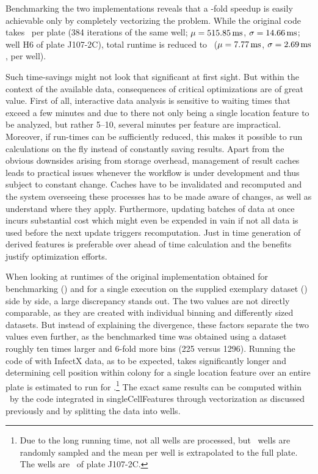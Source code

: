 
Benchmarking the two implementations reveals that a \knitrScfBenchmarkSpeedup -fold speedup is easily achievable only by completely vectorizing the problem. While the original code takes \knitrScfBenchmarkEdgeTotal\ per plate (384 iterations of the same well; $\mu=\SI{515.85}{\milli\second}$, $\sigma=\SI{14.66}{\milli\second}$; well H6 of plate J107-2C), total runtime is reduced to \knitrScfBenchmarkFacetTotal\ ($\mu=\SI{7.77}{\milli\second}$, $\sigma=\SI{2.69}{\milli\second}$, per well).

Such time-savings might not look that significant at first sight. But within the context of the available data, consequences of critical optimizations are of great value. First of all, interactive data analysis is sensitive to waiting times that exceed a few minutes and due to there not only being a single location feature to be analyzed, but rather 5--10, several minutes per feature are impractical. Moreover, if run-times can be sufficiently reduced, this makes it possible to run calculations on the fly instead of constantly saving results. Apart from the obvious downsides arising from storage overhead, management of result caches leads to practical issues whenever the workflow is under development and thus subject to constant change. Caches have to be invalidated and recomputed and the system overseeing these processes has to be made aware of changes, as well as understand where they apply. Furthermore, updating batches of data at once incurs substantial cost which might even be expended in vain if not all data is used before the next update triggers recomputation. Just in time generation of derived features is preferable over ahead of time calculation and the benefits justify optimization efforts.


When looking at runtimes of the original implementation obtained for benchmarking (\knitrScfBenchmarkEdgeTotal) and for a single execution on the supplied exemplary dataset (\knitrScfRnaicellEdgepos) side by side, a large discrepancy stands out. The two values are not directly comparable, as they are created with individual binning and differently sized datasets. But instead of explaining the divergence, these factors separate the two values even further, as the benchmarked time was obtained using a dataset roughly ten times larger and 6-fold more bins (225 versus 1296). Running the code of \citeauthor{Knapp2011} with InfectX data, as to be expected, takes significantly longer and determining cell position within colony for a single location feature over an entire plate is estimated to run for \knitrScfFullPlateRnaicellTime.\footnote{Due to the long running time, not all wells are processed, but \knitrScfFullPlateNSamp\ wells are randomly sampled and the mean per well is extrapolated to the full plate. The wells are \knitrScfFullPlateSampWell\ of plate J107-2C.} The exact same results can be computed within \knitrScfFullPlateMyTime\ by the code integrated in singleCellFeatures through vectorization as discussed previously and by splitting the data into wells.

